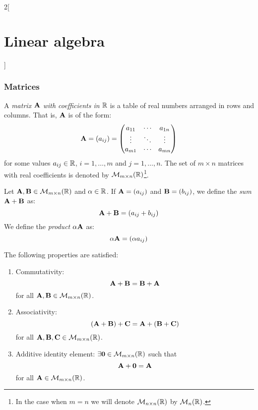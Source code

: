 \documentclass[../../../main.tex]{subfiles}
\begin{document}
\begin{multicols}{2}[\section{Linear algebra}]
\subsubsection*{Matrices}
\begin{definition}[Matrix]
    A \textit{matrix $\vb{A}$ with coefficients in $\mathbb{R}$} is a table of real numbers arranged in rows and columns. That is, $\vb{A}$ is of the form: 
    \begin{equation*}
        \vb{A}=(a_{ij})=
        \begin{pmatrix}
            a_{11} & \cdots & a_{1n} \\
            \vdots & \ddots & \vdots \\
            a_{m1} & \cdots & a_{mn} 
        \end{pmatrix}
    \end{equation*}
    for some values $a_{ij}\in\mathbb{R}$, $i=1,\ldots,m$ and $j=1,\ldots,n$. The set of $m\times n$ matrices with real coefficients is denoted by $\mathcal{M}_{m\times n}(\mathbb{R})$\footnote{In the case when $m=n$ we will denote $\mathcal{M}_{n\times n}(\mathbb{R})$ by $\mathcal{M}_n(\mathbb{R})$.}.
\end{definition}
\begin{definition}
    Let $\vb{A},\vb{B}\in\mathcal{M}_{m\times n}(\mathbb{R})$ and $\alpha\in\mathbb{R}$. If $\vb{A}=(a_{ij})$ and $\vb{B}=(b_{ij})$, we define the \textit{sum $\vb{A}+\vb{B}$} as: $$\vb{A}+\vb{B}=(a_{ij}+b_{ij})$$
    We define the \textit{product $\alpha\vb{A}$} as: $$\alpha\vb{A}=(\alpha a_{ij})$$
\end{definition}
\begin{prop}
    The following properties are satisfied:
    \begin{enumerate}
        \item Commutativity: $$\vb{A}+\vb{B}=\vb{B}+\vb{A}$$ for all $\vb{A},\vb{B}\in\mathcal{M}_{m\times n}(\mathbb{R})$.
        \item Associativity: $$(\vb{A}+\vb{B})+\vb{C}=\vb{A}+(\vb{B}+\vb{C})$$ for all $\vb{A},\vb{B},\vb{C}\in\mathcal{M}_{m\times n}(\mathbb{R})$.
        \item Additive identity element: $\exists\vb{0}\in\mathcal{M}_{m\times n}(\mathbb{R})$ such that $$\vb{A}+\vb{0}=\vb{A}$$ for all $\vb{A}\in\mathcal{M}_{m\times n}(\mathbb{R})$.

\end{enumerate}
\end{prop}
\end{multicols}
\end{document}
